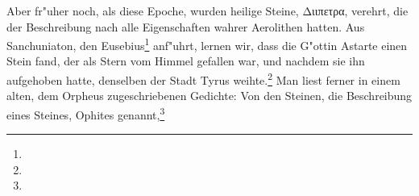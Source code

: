 \documentclass[a4paper, 11pt, oneside, polutonikogreek, german]{article}
\begin{document}
Aber fr"uher noch, als diese Epoche, wurden heilige Steine, Διιπετρα, verehrt, die der Beschreibung nach alle Eigenschaften wahrer Aerolithen hatten. Aus Sanchuniaton, den Eusebius\footnote{} anf"uhrt, lernen wir, dass die G"ottin Astarte einen Stein fand, der als Stern vom Himmel gefallen war, und nachdem sie ihn aufgehoben hatte, denselben der Stadt Tyrus weihte.\footnote{} Man liest ferner in einem alten, dem Orpheus zugeschriebenen Gedichte: Von den Steinen, die Beschreibung eines Steines, Ophites genannt,\footnote{}
\end{document}

